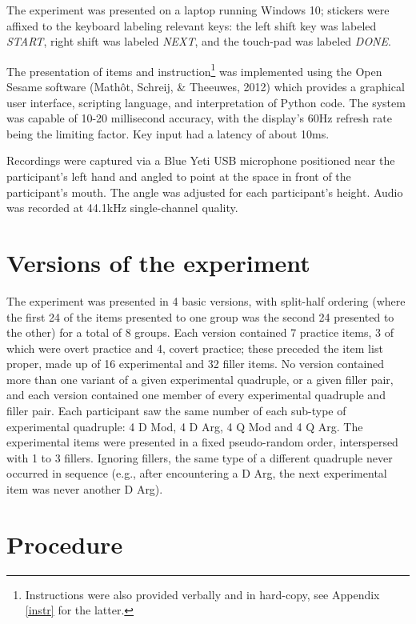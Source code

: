 \documentclass[11pt,oneside]{book}
\let\rmarkdownfootnote\footnote%
\def\footnote{\protect\rmarkdownfootnote}
\begin{document}
The experiment was presented on a laptop running Windows 10; stickers were affixed to the keyboard labeling relevant keys: the left shift key was labeled \emph{START}, right shift was labeled \emph{NEXT}, and the touch-pad was labeled \emph{DONE}.

The presentation of items and instruction\footnote{Instructions were also provided verbally and in hard-copy, see Appendix \ref{instr} for the latter.} was implemented using the Open Sesame software (Mathôt, Schreij, \& Theeuwes, 2012) which provides a graphical user interface, scripting language, and interpretation of Python code. The system was capable of 10-20 millisecond accuracy, with the display's 60Hz refresh rate being the limiting factor. Key input had a latency of about 10ms.

Recordings were captured via a Blue Yeti USB microphone positioned near the participant's left hand and angled to point at the space in front of the participant's mouth. The angle was adjusted for each participant's height. Audio was recorded at 44.1kHz single-channel quality.

\hypertarget{versions-of-the-experiment}{%
\section{Versions of the experiment}\label{versions-of-the-experiment}}

The experiment was presented in 4 basic versions, with split-half ordering (where the first 24 of the items presented to one group was the second 24 presented to the other) for a total of 8 groups. Each version contained 7 practice items, 3 of which were overt practice and 4, covert practice; these preceded the item list proper, made up of 16 experimental and 32 filler items. No version contained more than one variant of a given experimental quadruple, or a given filler pair, and each version contained one member of every experimental quadruple and filler pair. Each participant saw the same number of each sub-type of experimental quadruple: 4 D Mod, 4 D Arg, 4 Q Mod and 4 Q Arg. The experimental items were presented in a fixed pseudo-random order, interspersed with 1 to 3 fillers. Ignoring fillers, the same type of a different quadruple never occurred in sequence (e.g., after encountering a D Arg, the next experimental item was never another D Arg).

\hypertarget{procedure}{%
\section{Procedure}\label{procedure}}
\end{document}
